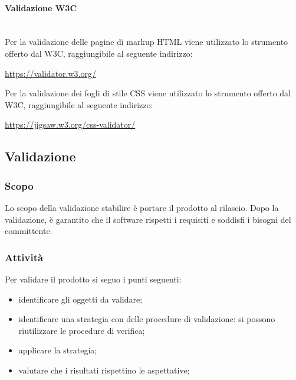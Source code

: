 		\paragraph{Validazione W3C} \mbox{}\\
		Per la validazione delle pagine di markup HTML viene utilizzato lo strumento offerto dal W3C, raggiungibile al seguente indirizzo: \newline
		\centerline{\url{https://validator.w3.org/}} \newline
		Per la validazione dei fogli di stile CSS viene utilizzato lo strumento offerto dal W3C, raggiungibile al seguente indirizzo: \newline
		\centerline{\url{https://jigsaw.w3.org/css-validator/}} \newline

\subsection{Validazione}
	\subsubsection{Scopo}
	Lo scopo della validazione stabilire è portare il prodotto al rilascio. Dopo la validazione, è garantito che il software rispetti i requisiti e soddisfi i bisogni del committente. 
	\subsubsection{Attività}
	Per validare il prodotto si seguo i punti seguenti:
	\begin{itemize}
		\item identificare gli oggetti da validare;
		\item identificare una strategia con delle procedure di validazione: si possono riutilizzare le procedure di verifica;
		\item applicare la strategia;
		\item valutare che i risultati rispettino le aspettative;
	\end{itemize}


	
